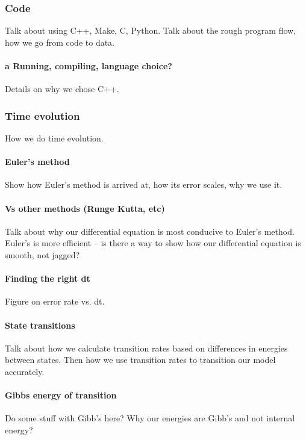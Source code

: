 \documentclass[10pt]{article} %
\begin{document}
\subsubsection{Code}
Talk about using C++, Make, C, Python. Talk about the rough program flow, how we go from code to
data.\\

\paragraph{a Running, compiling, language choice?}
Details on why we chose C++.\\
\subsubsection{Time evolution}
How we do time evolution.
\paragraph{Euler’s method}
Show how Euler's method is arrived at, how its error scales, why we use it.

\paragraph{Vs other methods (Runge Kutta, etc)}
Talk about why our differential equation is most conducive to Euler's method. Euler's is more
efficient -- is there a way to show how our differential equation is smooth, not jagged?

\paragraph{Finding the right dt}
Figure on error rate vs. dt.

\paragraph{State transitions}
Talk about how we calculate transition rates based on differences in energies between states.
Then how we use transition rates to transition our model accurately.\\

\paragraph{Gibbs energy of transition}
Do some stuff with Gibb's here? Why our energies are Gibb's and not internal energy?\\
\end{document}
